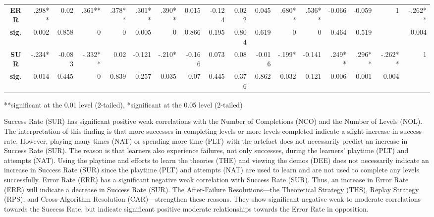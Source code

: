 \documentclass[conference]{IEEEtran}
\begin{document}
\begin{table}[]
{\begin{tabular}{|c|rrrrrr|rrrr|rrrrrr|}
      \textbf{ERR} & \cellcolor[HTML]{EFEFEF}.298** & 0.02 & \cellcolor[HTML]{EFEFEF}.361** & \cellcolor[HTML]{EFEFEF}.378** & \cellcolor[HTML]{EFEFEF}.301** & \cellcolor[HTML]{EFEFEF}.390** & 0.015 & -0.124 & 0.022 & 0.045 & \cellcolor[HTML]{EFEFEF}.680** & \cellcolor[HTML]{EFEFEF}.536** & -0.066 & -0.059 & 1 & \cellcolor[HTML]{EFEFEF}-.262** \\
      \textbf{sig.} & \cellcolor[HTML]{EFEFEF}0.002 & 0.858 & \cellcolor[HTML]{EFEFEF}0 & \cellcolor[HTML]{EFEFEF}0 & \cellcolor[HTML]{EFEFEF}0.005 & \cellcolor[HTML]{EFEFEF}0 & 0.866 & 0.195 & 0.804 & 0.619 & \cellcolor[HTML]{EFEFEF}0 & \cellcolor[HTML]{EFEFEF}0 & 0.464 & 0.519 &  & \cellcolor[HTML]{EFEFEF}0.004 \\
      \textbf{SUR} & \cellcolor[HTML]{EFEFEF}-.234* & -0.083 & \cellcolor[HTML]{EFEFEF}-.332** & 0.02 & -0.121 & \cellcolor[HTML]{EFEFEF}-.210* & -0.166 & 0.073 & 0.08 & -0.016 & \cellcolor[HTML]{EFEFEF}-.199* & \cellcolor[HTML]{EFEFEF}-0.141 & \cellcolor[HTML]{EFEFEF}.249** & \cellcolor[HTML]{EFEFEF}.296** & \cellcolor[HTML]{EFEFEF}-.262** & 1 \\
      \textbf{sig.} & \cellcolor[HTML]{EFEFEF}0.014 & 0.445 & \cellcolor[HTML]{EFEFEF}0 & 0.839 & 0.257 & \cellcolor[HTML]{EFEFEF}0.035 & 0.07 & 0.445 & 0.376 & 0.862 & \cellcolor[HTML]{EFEFEF}0.032 & \cellcolor[HTML]{EFEFEF}0.121 & \cellcolor[HTML]{EFEFEF}0.006 & \cellcolor[HTML]{EFEFEF}0.001 & \cellcolor[HTML]{EFEFEF}0.004 &  \\ \hline
    \end{tabular}%
  }
\flushright 
\scriptsize
**significant at the 0.01 level (2-tailed), *significant at the 0.05 level (2-tailed)
\end{table}

Success Rate (SUR) has significant positive weak correlations with the Number of Completions (NCO) and the Number of Levels (NOL). The interpretation of this finding is that more successes in completing levels or more levels completed indicate a slight increase in success rate. However, playing many times (NAT) or spending more time (PLT) with the artefact does not necessarily predict an increase in Success Rate (SUR). The reason is that learners also experience failures, not only successes, during the learners’ playtime (PLT) and attempts (NAT). Using the playtime and efforts to learn the theories (THE) and viewing the demos (DEE) does not necessarily indicate an increase in Success Rate (SUR) since the playtime (PLT) and attempts (NAT) are used to learn and are not used to complete any levels successfully. Error Rate (ERR) has a significant negative weak correlation with Success Rate (SUR). Thus, an increase in Error Rate (ERR) will indicate a decrease in Success Rate (SUR). The After-Failure Resolutions—the Theoretical Strategy (THS), Replay Strategy (RPS), and Cross-Algorithm Resolution (CAR)—strengthen these reasons. They show significant negative weak to moderate correlations towards the Success Rate, but indicate significant positive moderate relationships towards the Error Rate in opposition.
\end{document}
